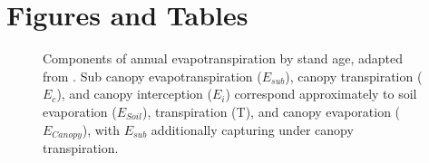 \documentclass[paper=a4,fontsize=12pt]{scrartcl}
\begin{document}
\newpage
\printbibliography[heading=bibintoc]


\newpage
\section{Figures and Tables}
\vspace{5em}
\begin{figure}[H]
	\centering
	
	\captionsetup{justification=justified, width=0.9\linewidth}
	\caption{Components of annual evapotranspiration by stand age, adapted from \textcite{oishi2020quantifying}. Sub canopy evapotranspiration ($E_{sub}$), canopy transpiration ($E_c$), and canopy interception ($E_i$) correspond approximately to soil evaporation ($E_{Soil}$), transpiration (T), and canopy evaporation ($E_{Canopy}$), with $E_{sub}$ additionally capturing under canopy transpiration.}
	\label{fig:oishi}
\end{figure}
\end{document}
